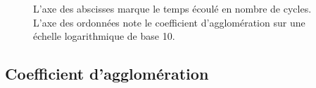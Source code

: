 \begin{figure}
  \centering
  \hspace{10pt}
  \caption{\label{net:fig:clustering}L'axe des abscisses marque le temps écoulé
    en nombre de cycles. L'axe des ordonnées note le coefficient d'agglomération
    sur une échelle logarithmique de base 10.}
\end{figure}

\subsection{Coefficient d'agglomération}

